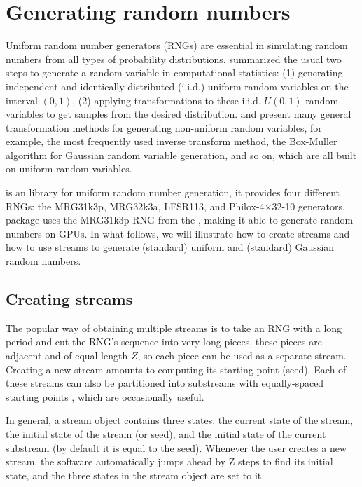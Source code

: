 \documentclass[article,nojss]{jss}\usepackage[]{graphicx}\usepackage[]{color}
\begin{document}
\section{Generating random numbers} \label{}
Uniform random number generators (RNGs) are essential in simulating random numbers from all types of probability distributions. \cite{l2012random} summarized the usual two steps to generate a random variable in computational statistics: (1) generating independent and identically distributed (i.i.d.) uniform random variables on the interval $(0, 1)$, (2) applying transformations to these i.i.d. $U(0, 1)$ random variables to get samples from the desired distribution. \cite{l2012random} and \cite{robert2004random} present many general transformation methods for generating non-uniform random variables, for example, the most frequently used inverse transform method, the Box-Muller algorithm \citep{box1958note} for Gaussian random variable generation, and so on, which are all built on uniform random variables. %


 is an  library for uniform random number generation, it provides four different RNGs: the MRG31k3p, MRG32k3a, LFSR113, and Philox-4×32-10 generators.  package uses the MRG31k3p RNG from the , making it able to generate random numbers on GPUs. In what follows, we will illustrate how to create streams and how to use streams to generate (standard) uniform and (standard) Gaussian random numbers. 


\subsection{Creating streams}\label{create_streams}
The popular way of obtaining multiple streams is to take an RNG with a long period and cut the RNG's sequence into very long pieces, these pieces are adjacent and of equal length $Z$, so each piece can be used as a separate stream. Creating a new stream amounts to computing its starting point (seed). Each of these streams can also be partitioned into substreams with equally-spaced starting points \citep{l2002object}, which are occasionally useful.

In general, a stream object contains three states: the current state of the stream, the initial state of the stream (or seed), and the initial state of the current substream (by default it is equal to the seed). Whenever the user creates a new stream, the software automatically jumps ahead by Z steps to find its initial state, and the three states in the stream object are set to it. 
\end{document}
